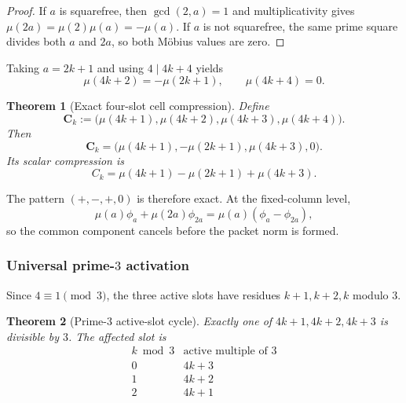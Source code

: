 \documentclass[11pt]{article}
\newtheorem{theorem}{Theorem}[section]
\theoremstyle{definition}
\theoremstyle{remark}
\newcommand{\1}{\mathbf{1}}
\begin{document}
\begin{proof}
If $a$ is squarefree, then $\gcd(2,a)=1$ and multiplicativity gives
$\mu(2a)=\mu(2)\mu(a)=-\mu(a)$.  If $a$ is not squarefree, the same prime
square divides both $a$ and $2a$, so both M\"obius values are zero.
\end{proof}

Taking $a=2k+1$ and using $4\mid4k+4$ yields
\begin{equation}
 \mu(4k+2)=-\mu(2k+1),
 \qquad
 \mu(4k+4)=0.
 \label{eq:dyadic-two-identities}
\end{equation}

\begin{theorem}[Exact four-slot cell compression]
\label{thm:exact-four-slot-cell}
Define
\[
 \mathbf C_k
 :=\bigl(\mu(4k+1),\mu(4k+2),\mu(4k+3),\mu(4k+4)\bigr).
\]
Then
\begin{equation}
 \boxed{
 \mathbf C_k
 =\bigl(\mu(4k+1),-\mu(2k+1),\mu(4k+3),0\bigr).
 }
 \label{eq:exact-four-slot-cell}
\end{equation}
Its scalar compression is
\begin{equation}
 \boxed{
 C_k=\mu(4k+1)-\mu(2k+1)+\mu(4k+3).
 }
 \label{eq:compressed-cell}
\end{equation}
\end{theorem}

The pattern $(+,-,+,0)$ is therefore exact.  At the fixed-column level,
\begin{equation}
 \mu(a)\phi_a+\mu(2a)\phi_{2a}
 =\mu(a)(\phi_a-\phi_{2a}),
 \label{eq:exact-doubling-column-difference}
\end{equation}
so the common component cancels before the packet norm is formed.

\subsubsection{Universal prime-$3$ activation}

Since $4\equiv1\pmod3$, the three active slots have residues
$k+1,k+2,k$ modulo $3$.

\begin{theorem}[Prime-$3$ active-slot cycle]
\label{thm:prime-three-active-slot-cycle}
Exactly one of $4k+1,4k+2,4k+3$ is divisible by $3$.  The affected slot is
\begin{equation}
 \begin{array}{c|c}
 k\bmod3&\text{active multiple of }3\\
 \hline
 0&4k+3\\
 1&4k+2\\
 2&4k+1
 \end{array}
 \label{eq:prime-three-slot-cycle}
\end{equation}
\end{theorem}
\end{document}
